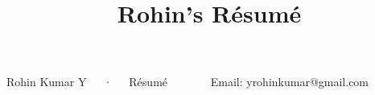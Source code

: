 \documentclass[11pt, a4paper]{awesome-cv}
\title{Rohin's Résumé}
\begin{document}
\makecvheader[L]

\makecvfooter
  {Rohin Kumar Y~~~·~~~Résumé~~~~~~~}
  {Email: {yrohinkumar@gmail.com}}
  {\thepage}


% 




% 


\newpage








%


\end{document}
